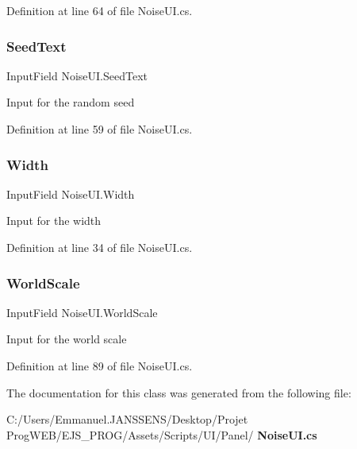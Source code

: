 Definition at line 64 of file Noise\+U\+I.\+cs.

\mbox{\label{class_noise_u_i_a78dec6b07ed55dd2ab08f9ab059fcd9f}} 
\subsubsection{Seed\+Text}
{\footnotesize\ttfamily Input\+Field Noise\+U\+I.\+Seed\+Text}



Input for the random seed 



Definition at line 59 of file Noise\+U\+I.\+cs.

\mbox{\label{class_noise_u_i_a39be47443ea942b1aa71e2cb10c50046}} 
\subsubsection{Width}
{\footnotesize\ttfamily Input\+Field Noise\+U\+I.\+Width}



Input for the width 



Definition at line 34 of file Noise\+U\+I.\+cs.

\mbox{\label{class_noise_u_i_a93e63386ef3ddd9d547e134b972a8329}} 
\subsubsection{World\+Scale}
{\footnotesize\ttfamily Input\+Field Noise\+U\+I.\+World\+Scale}



Input for the world scale 



Definition at line 89 of file Noise\+U\+I.\+cs.



The documentation for this class was generated from the following file\+:\begin{DoxyCompactItemize}
\item 
C\+:/\+Users/\+Emmanuel.\+J\+A\+N\+S\+S\+E\+N\+S/\+Desktop/\+Projet Prog\+W\+E\+B/\+E\+J\+S\+\_\+\+P\+R\+O\+G/\+Assets/\+Scripts/\+U\+I/\+Panel/\textbf{ Noise\+U\+I.\+cs}\end{DoxyCompactItemize}

